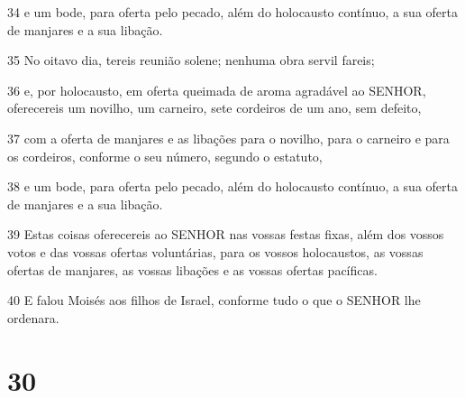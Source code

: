 \par 34 e um bode, para oferta pelo pecado, além do holocausto contínuo, a sua oferta de manjares e a sua libação.
\par 35 No oitavo dia, tereis reunião solene; nenhuma obra servil fareis;
\par 36 e, por holocausto, em oferta queimada de aroma agradável ao SENHOR, oferecereis um novilho, um carneiro, sete cordeiros de um ano, sem defeito,
\par 37 com a oferta de manjares e as libações para o novilho, para o carneiro e para os cordeiros, conforme o seu número, segundo o estatuto,
\par 38 e um bode, para oferta pelo pecado, além do holocausto contínuo, a sua oferta de manjares e a sua libação.
\par 39 Estas coisas oferecereis ao SENHOR nas vossas festas fixas, além dos vossos votos e das vossas ofertas voluntárias, para os vossos holocaustos, as vossas ofertas de manjares, as vossas libações e as vossas ofertas pacíficas.
\par 40 E falou Moisés aos filhos de Israel, conforme tudo o que o SENHOR lhe ordenara.

\chapter{30}

